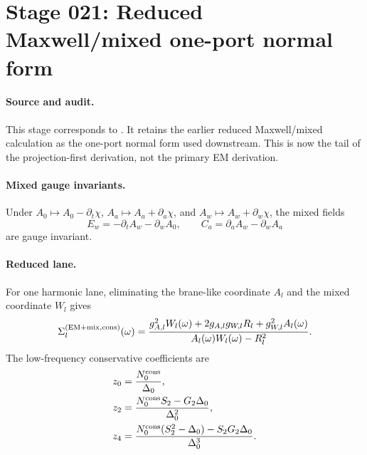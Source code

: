 \section[Stage 021]{Stage 021: Reduced Maxwell/mixed one-port normal form}
\label{stage:021}


\paragraph{Source and audit.}
This stage corresponds to
.
It retains the earlier reduced Maxwell/mixed calculation as the one-port
normal form used downstream.  This is now the tail of the projection-first
derivation, not the primary EM derivation.

\paragraph{Mixed gauge invariants.}
Under \(A_0\mapsto A_0-\partial_t\chi\), \(A_a\mapsto A_a+\partial_a\chi\),
and \(A_w\mapsto A_w+\partial_w\chi\), the mixed fields
\begin{equation}
\label{eq:app-stage021-mixed-fields}
E_w=-\partial_tA_w-\partial_wA_0,
\qquad
C_a=\partial_aA_w-\partial_wA_a
\end{equation}
are gauge invariant.

\paragraph{Reduced lane.}
For one harmonic lane, eliminating the brane-like coordinate \(A_l\) and the
mixed coordinate \(W_l\) gives
\begin{equation}
\label{eq:app-stage021-self-energy}
\Sigma_l^{({\rm EM}+{\rm mix},{\rm cons})}(\omega)
=
\frac{g_{A,l}^2W_l(\omega)+2g_{A,l}g_{W,l}R_l+g_{W,l}^2A_l(\omega)}
{A_l(\omega)W_l(\omega)-R_l^2}.
\end{equation}
The low-frequency conservative coefficients are
\begin{align}
\label{eq:app-stage021-z-coeffs}
z_0&=\frac{N_0^{\rm cons}}{\Delta_0},\\
z_2&=\frac{N_0^{\rm cons}S_2-G_2\Delta_0}{\Delta_0^2},\\
z_4&=\frac{N_0^{\rm cons}(S_2^2-\Delta_0)-S_2G_2\Delta_0}{\Delta_0^3}.
\end{align}

